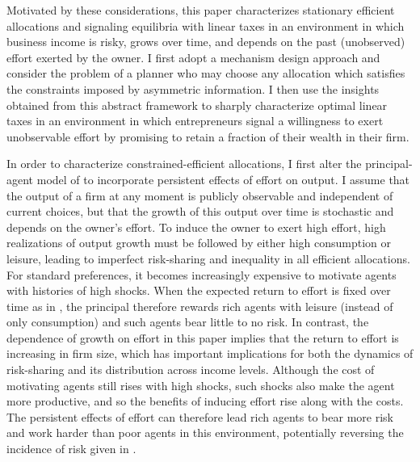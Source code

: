 \documentclass[11pt]{article}
\theoremstyle{plain}
\begin{document}
Motivated by these considerations, this paper characterizes stationary efficient allocations and signaling equilibria with linear taxes in an environment in which business income is risky, grows over time, and depends on the past (unobserved) effort exerted by the owner. I first adopt a mechanism design approach and consider the problem of a planner who may choose any allocation which satisfies the constraints imposed by asymmetric information. I then use the insights obtained from this abstract framework to sharply characterize optimal linear taxes in an environment in which entrepreneurs signal a willingness to exert unobservable effort by promising to retain a fraction of their wealth in their firm. 


In order to characterize constrained-efficient allocations, I first alter the principal-agent model of \cite{sannikov_continuous-time_2008} to incorporate persistent effects of effort on output. I assume that the output of a firm at any moment is publicly observable and independent of current choices, but that the growth of this output over time is stochastic and depends on the owner's effort. To induce the owner to exert high effort, high realizations of output growth must be followed by either high consumption or leisure, leading to imperfect risk-sharing and inequality in all efficient allocations. For standard preferences, it becomes increasingly expensive to motivate agents with histories of high shocks. When the expected return to effort is fixed over time as in \cite{sannikov_continuous-time_2008}, the principal therefore rewards rich agents with leisure (instead of only consumption) and such agents bear little to no risk. In contrast, the dependence of growth on effort in this paper implies that the return to effort is increasing in firm size, which has important implications for both the dynamics of risk-sharing and its distribution across income levels. Although the cost of motivating agents still rises with high shocks, such shocks also make the agent more productive, and so the benefits of inducing effort rise along with the costs. The persistent effects of effort can therefore lead rich agents to bear more risk and work harder than poor agents in this environment, potentially reversing the incidence of risk given in \cite{sannikov_continuous-time_2008}.
\end{document}
